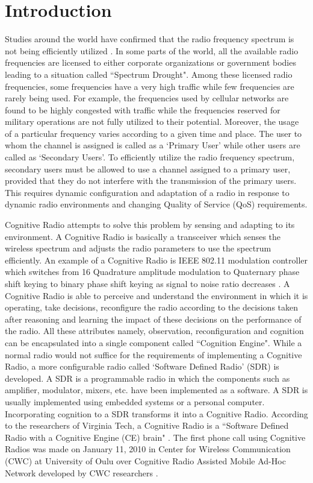 \documentclass[conference]{IEEEtran}
\begin{document}
\section{Introduction}
    Studies around the world have confirmed that the radio frequency spectrum is not being efficiently utilized \cite{1}. In some parts of the world, all the available radio frequencies are licensed to either corporate organizations or government bodies leading to a situation called ``Spectrum Drought". Among these licensed radio frequencies, some frequencies have a very high traffic while few frequencies are rarely being used. For example, the frequencies used by cellular networks are found to be highly congested with traffic while the frequencies reserved for military operations are not fully utilized to their potential. Moreover, the usage of a particular frequency varies according to a given time and place. The user to whom the channel is assigned is called as a `Primary User' while other users are called as `Secondary Users'. To efficiently utilize the radio frequency spectrum, secondary users must be allowed to use a channel assigned to a primary user, provided that they do not interfere with the transmission of the primary users. This requires dynamic configuration and adaptation of a radio in response to dynamic radio environments and changing Quality of Service (QoS) requirements.

	Cognitive Radio attempts to solve this problem by sensing and adapting to its environment. A Cognitive Radio is basically a transceiver which senses the wireless spectrum and adjusts the radio parameters to use the spectrum efficiently. An example of a Cognitive Radio is IEEE 802.11 modulation controller which switches from 16 Quadrature amplitude modulation to Quaternary phase shift keying to binary phase shift keying as signal to noise ratio decreases \cite{4}. A Cognitive Radio is able to perceive and understand the environment in which it is operating, take decisions, reconfigure the radio according to the decisions taken after reasoning and learning the impact of these decisions on the performance of the radio. All these attributes namely, observation, reconfiguration and cognition can be encapsulated into a single component called ``Cognition Engine". While a normal radio would not suffice for the requirements of implementing a Cognitive Radio, a more configurable radio called `Software Defined Radio' (SDR) is developed. A SDR is a programmable radio in which the components such as amplifier, modulator, mixers, etc. have been implemented as a software. A SDR is usually implemented using embedded systems or a personal computer. Incorporating cognition to a SDR transforms it into a Cognitive Radio. According to the researchers of Virginia Tech, a Cognitive Radio is a ``Software Defined Radio with a Cognitive Engine (CE) brain" \cite{5}. The first phone call using Cognitive Radios was made on January 11, 2010 in Center for Wireless Communication (CWC) at University of Oulu over Cognitive Radio Assisted Mobile Ad-Hoc Network developed by CWC researchers \cite{2}.
    
\end{document}
